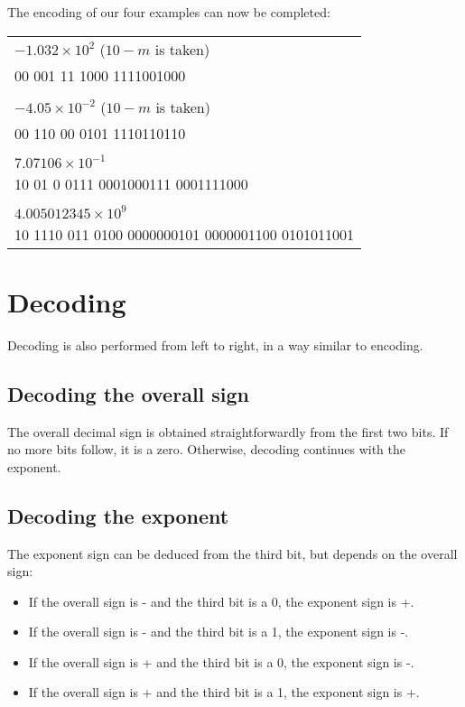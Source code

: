 \documentclass{acm_proc_article-sp}
\begin{document}
The encoding of our four examples can now be completed:

\begin{tabular}{l}
$- 1.032 \times 10^2$ ($10-m$ is taken)\\
00 001 11 1000 1111001000\\
\\
$-4.05 \times 10^{-2}$ ($10-m$ is taken)\\
00 110 00 0101 1110110110\\
\\
$7.07106 \times 10^{-1}$\\
10 01 0 0111 0001000111 0001111000\\
\\
$4.005012345 \times 10^9$\\
10 1110 011 0100 0000000101 0000001100 0101011001\\
\end{tabular}

\section{Decoding}
\label{section-decoding}

Decoding is also performed from left to right, in a way similar to encoding.

\vspace{20pt}
\subsection{Decoding the overall sign}

The overall decimal sign is obtained straightforwardly from the first two bits. If no more bits follow, it is a zero. Otherwise, decoding continues with the exponent.

\subsection{Decoding the exponent}

The exponent sign can be deduced from the third bit, but depends on the overall sign:

\begin{itemize}
\item If the overall sign is - and the third bit is a 0, the exponent sign is +.
\item If the overall sign is - and the third bit is a 1, the exponent sign is -.
\item If the overall sign is + and the third bit is a 0, the exponent sign is -.
\item If the overall sign is + and the third bit is a 1, the exponent sign is +.
\end{itemize}
\end{document}
